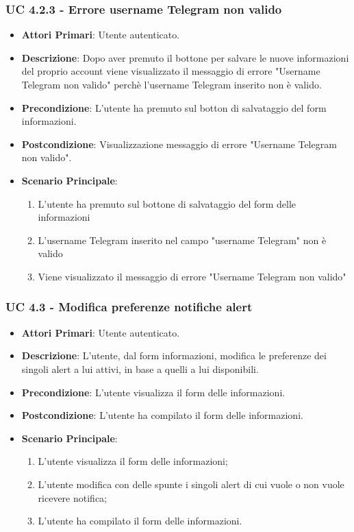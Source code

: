 			\subsubsection{UC 4.2.3 - Errore username Telegram non valido}
			\begin{itemize}
				\item \textbf{Attori Primari}: Utente autenticato.
				\item \textbf{Descrizione}: Dopo aver premuto il bottone per salvare le nuove informazioni del proprio account viene visualizzato il messaggio di errore "Username Telegram non valido" perchè l'username Telegram inserito non è valido. 
				\item \textbf{Precondizione}: L'utente ha premuto sul botton di salvataggio del form informazioni.
				\item \textbf{Postcondizione}: Visualizzazione messaggio di errore "Username Telegram non valido".
				\item \textbf{Scenario Principale}:
				\begin{enumerate}
					\item{L'utente ha premuto sul bottone di salvataggio del form delle informazioni}
					\item{L'username Telegram inserito nel campo "username Telegram" non è valido}
					\item{Viene visualizzato il messaggio di errore "Username Telegram non valido"}
				\end{enumerate}	
			\end{itemize}

			\subsubsection{UC 4.3 - Modifica preferenze notifiche alert}
			\begin{itemize}
				\item \textbf{Attori Primari}: Utente autenticato.
				\item \textbf{Descrizione}: L'utente, dal form informazioni, modifica le preferenze dei singoli alert a lui attivi, in base a quelli a lui disponibili.
				\item \textbf{Precondizione}: L'utente visualizza il form delle informazioni.
				\item \textbf{Postcondizione}: L'utente ha compilato il form delle informazioni.
				\item \textbf{Scenario Principale}:
				\begin{enumerate}
					\item{L'utente visualizza il form delle informazioni;}
					\item{L'utente modifica con delle spunte i singoli alert di cui vuole o non vuole ricevere notifica; }
					\item{L'utente ha compilato il form delle informazioni.}
				\end{enumerate}
			\end{itemize}